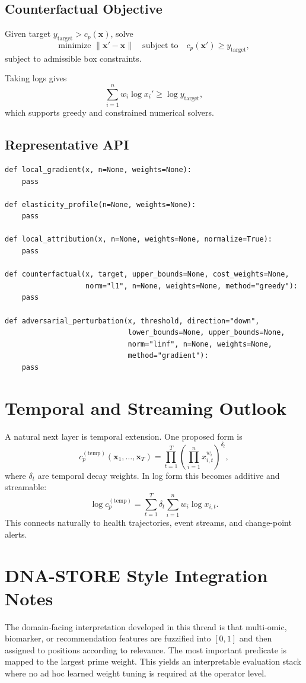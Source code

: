 \documentclass[11pt]{article}
\begin{document}
\subsection{Counterfactual Objective}
Given target $y_{\mathrm{target}} > c_p(\mathbf{x})$, solve
\[
\text{minimize } \|\mathbf{x}'-\mathbf{x}\| 
\quad \text{subject to} \quad c_p(\mathbf{x}') \ge y_{\mathrm{target}},
\]
subject to admissible box constraints.

Taking logs gives
\[
\sum_{i=1}^{n} w_i \log x_i' \ge \log y_{\mathrm{target}},
\]
which supports greedy and constrained numerical solvers.

\subsection{Representative API}
\begin{lstlisting}[style=pystyle]
def local_gradient(x, n=None, weights=None):
    pass

def elasticity_profile(n=None, weights=None):
    pass

def local_attribution(x, n=None, weights=None, normalize=True):
    pass

def counterfactual(x, target, upper_bounds=None, cost_weights=None,
                   norm="l1", n=None, weights=None, method="greedy"):
    pass

def adversarial_perturbation(x, threshold, direction="down",
                             lower_bounds=None, upper_bounds=None,
                             norm="linf", n=None, weights=None,
                             method="gradient"):
    pass
\end{lstlisting}

\section{Temporal and Streaming Outlook}
A natural next layer is temporal extension. One proposed form is
\[
 c_p^{(\mathrm{temp})}(\mathbf{x}_1,\dots,\mathbf{x}_T) =
 \prod_{t=1}^{T} \left(\prod_{i=1}^{n} x_{i,t}^{w_i}\right)^{\delta_t},
\]
where $\delta_t$ are temporal decay weights. In log form this becomes additive and streamable:
\[
 \log c_p^{(\mathrm{temp})} = \sum_{t=1}^{T} \delta_t \sum_{i=1}^{n} w_i \log x_{i,t}.
\]
This connects naturally to health trajectories, event streams, and change-point alerts.

\section{DNA-STORE Style Integration Notes}
The domain-facing interpretation developed in this thread is that multi-omic, biomarker, or recommendation features are fuzzified into $[0,1]$ and then assigned to positions according to relevance. The most important predicate is mapped to the largest prime weight. This yields an interpretable evaluation stack where no ad hoc learned weight tuning is required at the operator level.
\end{document}
